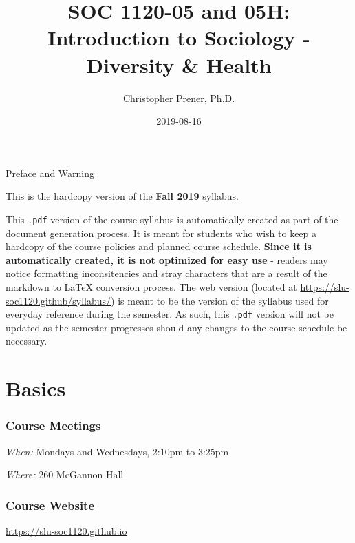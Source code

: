 \documentclass[]{book}
\title{SOC 1120-05 and 05H: Introduction to Sociology - Diversity \& Health}
\author{Christopher Prener, Ph.D.}
\date{2019-08-16}
\begin{document}
\maketitle

\begin{center}
{\huge Preface and Warning} \\
\end{center}
\vspace{5mm}
This is the hardcopy version of the \textbf{Fall 2019} syllabus.
\vspace{5mm}
\par \noindent This \texttt{.pdf} version of the course syllabus is automatically created as part of the document generation process. It is meant for students who wish to keep a hardcopy of the course policies and planned course schedule. \textbf{Since it is automatically created, it is not optimized for easy use} - readers may notice formatting inconsitencies and stray characters that are a result of the markdown to \LaTeX{} conversion process. The web version (located at \href{https://slu-soc1120.github/syllabus/}{https://slu-soc1120.github/syllabus/}) is meant to be the version of the syllabus used for everyday reference during the semester. As such, this \texttt{.pdf} version will not be updated as the semester progresses should any changes to the course schedule be necessary.

\hypertarget{basics}{%
\chapter*{Basics}\label{basics}}

\hypertarget{course-meetings}{%
\subsection*{Course Meetings}\label{course-meetings}}

\emph{When:} Mondays and Wednesdays, 2:10pm to 3:25pm

\emph{Where:} 260 McGannon Hall

\hypertarget{course-website}{%
\subsection*{Course Website}\label{course-website}}

\url{https://slu-soc1120.github.io}
\end{document}
